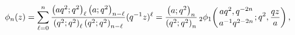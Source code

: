 \[\phi_{n}(z)=\sum_{\ell=0}^{n}\frac{\left(aq^{2};q^{2}\right)_{\ell}\left(a;q^{%
2}\right)_{n-\ell}}{\left(q^{2};q^{2}\right)_{\ell}\left(q^{2};q^{2}\right)_{n%
-\ell}}(q^{-1}z)^{\ell}=\frac{\left(a;q^{2}\right)_{n}}{\left(q^{2};q^{2}%
\right)_{n}}\mathop{{{}_{2}\phi_{1}}\/}\nolimits\!\left({aq^{2},q^{-2n}\atop a%
^{-1}q^{2-2n}};q^{2},\frac{qz}{a}\right),\]